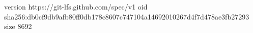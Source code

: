 version https://git-lfs.github.com/spec/v1
oid sha256:db0cf9db9afb80ff0db178c8607c747104a14692010267d4f7d478ae3fb27293
size 8692
